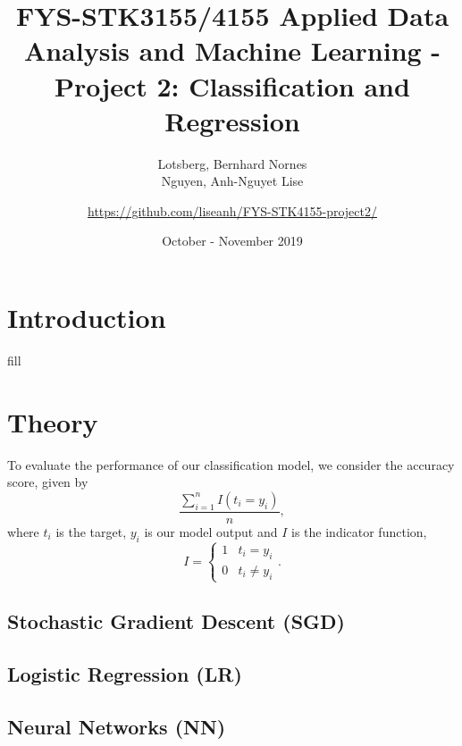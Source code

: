 \documentclass[a4paper, 11pt, twocolumn]{article}
\title{FYS-STK3155/4155 Applied Data Analysis and Machine Learning - Project 2: Classification and Regression }
\author{Lotsberg, Bernhard Nornes \\ Nguyen, Anh-Nguyet Lise \and \url{https://github.com/liseanh/FYS-STK4155-project2/}}
\date{October - November 2019}
\begin{document}

\section{Introduction}

fill


\section{Theory}
To evaluate the performance of our classification model, we consider the accuracy score, given by 
\begin{equation}
\label{eq:accuracy}
\frac{\sum_{i=1}^nI(t_i=y_i)}{n},
\end{equation}
where $t_i$ is the target, $y_i$ is our model output and $I$ is the indicator function, 
\[
I = \begin{cases} 
1 & t_i = y_i\\
0 & t_i \neq y_i
\end{cases} .
\]
\subsection{Stochastic Gradient Descent (SGD)}

\subsection{Logistic Regression (LR)}

\subsection{Neural Networks (NN)}
\end{document}
